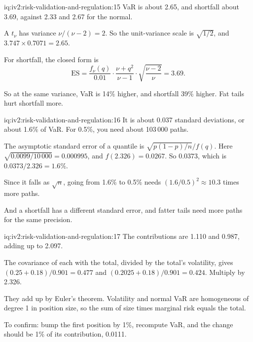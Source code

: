 \begin{solution}{iq:iv2:risk-validation-and-regulation:15}
VaR is about 2.65, and shortfall about 3.69, against 2.33 and 2.67 for the normal.

A $t_\nu$ has variance $\nu/(\nu - 2) = 2$. So the unit-variance scale is $\sqrt{1/2}$, and $3.747 \times 0.7071 = 2.65$.

For shortfall, the closed form is
\[
\mathrm{ES} = \frac{f_\nu(q)}{0.01}\cdot\frac{\nu + q^2}{\nu - 1}\cdot\sqrt{\frac{\nu - 2}{\nu}} = 3.69.
\]

So at the same variance, VaR is 14\% higher, and shortfall 39\% higher. Fat tails hurt shortfall more.

\end{solution}

\begin{solution}{iq:iv2:risk-validation-and-regulation:16}
It is about 0.037 standard deviations, or about 1.6\% of VaR. For 0.5\%, you need about 103\,000 paths.

The asymptotic standard error of a quantile is $\sqrt{p(1 - p)/n}/f(q)$. Here $\sqrt{0.0099/10\,000} = 0.000995$, and $f(2.326) = 0.0267$. So $0.0373$, which is $0.0373/2.326 = 1.6\%$.

Since it falls as $\sqrt{n}$, going from 1.6\% to 0.5\% needs $(1.6/0.5)^2 \approx 10.3$ times more paths.

And a shortfall has a different standard error, and fatter tails need more paths for the same precision.

\end{solution}

\begin{solution}{iq:iv2:risk-validation-and-regulation:17}
The contributions are 1.110 and 0.987, adding up to 2.097.

The covariance of each with the total, divided by the total's volatility, gives $(0.25 + 0.18)/0.901 = 0.477$ and $(0.2025 + 0.18)/0.901 = 0.424$. Multiply by 2.326.

They add up by Euler's theorem. Volatility and normal VaR are homogeneous of degree 1 in position size, so the sum of size times marginal risk equals the total.

To confirm: bump the first position by 1\%, recompute VaR, and the change should be 1\% of its contribution, 0.0111.

\end{solution}

